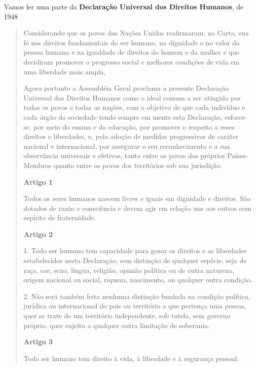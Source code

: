 

Vamos ler uma parte da \textbf{Declaração Universal dos Direitos Humanos}, de 1948

\begin{quote}
Considerando que os povos das Nações Unidas reafirmaram, na Carta, sua
fé nos direitos fundamentais do ser humano, na dignidade e no valor da
pessoa humana e na igualdade de direitos do homem e da mulher e que
decidiram promover o progresso social e melhores condições de vida em
uma liberdade mais ampla,

Agora portanto a Assembléia Geral proclama a presente Declaração
Universal dos Direitos Humanos como o ideal comum a ser atingido por
todos os povos e todas as nações, com o objetivo de que cada indivíduo e
cada órgão da sociedade tendo sempre em mente esta Declaração,
esforce-se, por meio do ensino e da educação, por promover o respeito a
esses direitos e liberdades, e, pela adoção de medidas progressivas de
caráter nacional e internacional, por assegurar o seu reconhecimento e a
sua observância universais e efetivos, tanto entre os povos dos próprios
Países-Membros quanto entre os povos dos territórios sob sua jurisdição.

\textbf{Artigo 1}

Todos os seres humanos nascem livres e iguais em dignidade e direitos.
São dotados de razão e consciência e devem agir em relação uns aos
outros com espírito de fraternidade.

\textbf{Artigo 2}

1. Todo ser humano tem capacidade para gozar os direitos e as liberdades
estabelecidos nesta Declaração, sem distinção de qualquer espécie, seja
de raça, cor, sexo, língua, religião, opinião política ou de outra
natureza, origem nacional ou social, riqueza, nascimento, ou qualquer
outra condição.

2. Não será também feita nenhuma distinção fundada na condição política,
jurídica ou internacional do país ou território a que pertença uma
pessoa, quer se trate de um território independente, sob tutela, sem
governo próprio, quer sujeito a qualquer outra limitação de soberania.

\textbf{Artigo 3}

Todo ser humano tem direito à vida, à liberdade e à segurança pessoal.

\end{quote}

